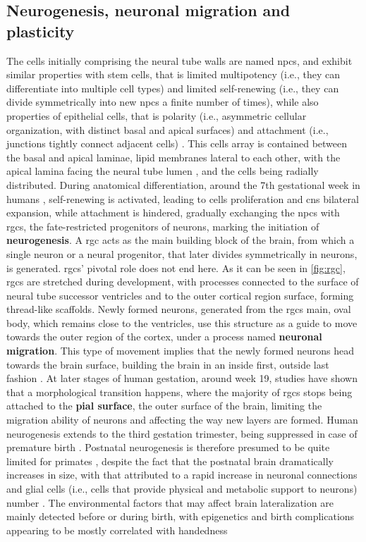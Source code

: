 \subsection{Neurogenesis, neuronal migration and plasticity}
\label{subsec:plasticity}
The cells initially comprising the neural tube walls are named \acp{npc}, and exhibit similar properties with stem cells, that is limited multipotency (i.e., they can differentiate into multiple cell types) and limited self-renewing (i.e., they can divide symmetrically into new \acp{npc} a finite number of times), while also properties of epithelial cells, that is polarity (i.e., asymmetric cellular organization, with distinct basal and apical surfaces)  and attachment (i.e., junctions tightly connect adjacent cells) \cite{Gotz2005}. This cells array is contained between the basal and apical laminae, lipid membranes lateral to each other, with the apical lamina facing the neural tube lumen \cite{Aaku-Saraste1997}, and the cells being radially distributed. During anatomical differentiation, around the 7th gestational week in humans \cite{Nowakowski2016}, self-renewing is activated, leading to cells proliferation and \ac{cns} bilateral expansion, while attachment is hindered, gradually exchanging the \acp{npc} with \acp{rgc}, the fate-restricted progenitors of neurons, marking the initiation of \textbf{neurogenesis}\cite{Gotz2005}. A \ac{rgc} acts as the main building block of the brain, from which a single neuron or a neural progenitor, that later divides symmetrically in neurons, is generated. \Acp{rgc}' pivotal role does not end here. As it can be seen in \autoref{fig:rgc}, \acsp{rgc} are stretched during development, with processes connected to the surface of neural tube successor ventricles and to the outer cortical region surface, forming thread-like scaffolds. Newly formed neurons, generated from the \acsp{rgc} main, oval body, which remains close to the ventricles, use this structure as a guide to move towards the outer region of the cortex, under a process named \textbf{neuronal migration}\cite{Rakic2009}. This type of movement implies that the newly formed neurons head towards the brain surface, building the brain in an inside first, outside last fashion \cite{Molnar2019}. At later stages of human gestation, around week 19, studies have shown that a morphological transition happens, where the majority of \acp{rgc} stops being attached to the \textbf{pial surface}, the outer surface of the brain, limiting the migration ability of neurons  \cite{Nowakowski2016} and affecting the way new layers are formed. Human neurogenesis extends to the third gestation trimester, being suppressed in case of premature birth \cite{Malik2013}. Postnatal neurogenesis is therefore presumed to be quite limited for primates \cite{Ernst2015}, despite the fact that the postnatal brain  dramatically increases in size, with that attributed to a rapid increase in neuronal connections and glial cells (i.e., cells that provide physical and metabolic support to neurons) number \cite{Dyck2017}. The environmental factors that may affect brain lateralization are mainly detected before or during birth, with epigenetics and birth complications  appearing to be mostly correlated with handedness 